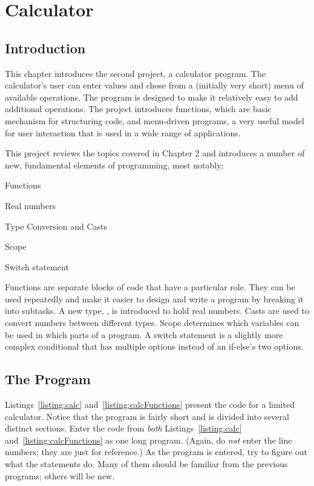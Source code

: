 \chapter{Calculator}

\section{Introduction}

This chapter introduces the second project, a calculator program.  The calculator's user can enter values and chose from a (initially very short) menu of available operations.  The program is designed to make it relatively easy to add additional operations.  The project introduces functions, which are basic mechanism for structuring code, and menu-driven programs, a very useful model for user interaction that is used in a wide range of  applications.

This project reviews the topics covered in Chapter 2 and introduces a number of new,  fundamental elements of programming, most notably:
\begin{tight_itemize}
  \item Functions
  \item Real numbers
\item Type Conversion and Casts
  \item Scope
  \item Switch statement
\end{tight_itemize}
Functions are separate blocks of code that have a particular role.  They can be used repeatedly and make it easier to design and write a program by breaking it into subtasks.  A new type, , is introduced to hold real numbers.  Casts are used to convert numbers between different types.  Scope determines which variables can be used in which parts of a program.  A switch statement is a slightly more complex conditional that has multiple options instead of an if-else's two options.  

\section{The Program} 

Listings~\ref{listing:calc} and~\ref{listing:calcFunctions} present the code for a limited calculator.  Notice that the program is fairly short and is divided into several distinct sections.  Enter the code from \emph{both} Listings~\ref{listing:calc} and~\ref{listing:calcFunctions} as one long program.  (Again, do \emph{not} enter the line numbers; they are just for reference.)  As the program is entered, try to figure out what the statements do.  Many of them should be familiar from the previous programs; others will be new.  

